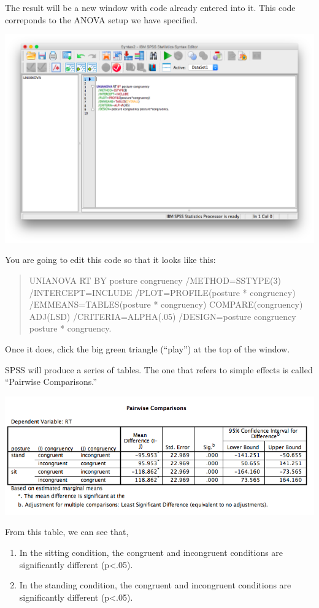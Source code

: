 \documentclass[
]{book}
\providecommand{\tightlist}{%
  \setlength{\itemsep}{0pt}\setlength{\parskip}{0pt}}
\begin{document}
The result will be a new window with code already entered into it. This code correponds to the ANOVA setup we have specified.

\includegraphics{img/10.4.20.png}

You are going to edit this code so that it looks like this:

\begin{quote}
UNIANOVA RT BY posture congruency
/METHOD=SSTYPE(3)
/INTERCEPT=INCLUDE
/PLOT=PROFILE(posture * congruency)
/EMMEANS=TABLES(posture * congruency) COMPARE(congruency) ADJ(LSD)
/CRITERIA=ALPHA(.05)
/DESIGN=posture congruency posture * congruency.
\end{quote}

Once it does, click the big green triangle (``{play}'') at the top of the window.

SPSS will produce a series of tables. The one that refers to simple effects is called ``Pairwise Comparisons.''

\includegraphics{img/10.4.22.png}

From this table, we can see that,

\begin{enumerate}
\def\labelenumi{\arabic{enumi}.}
\tightlist
\item
  In the sitting condition, the congruent and incongruent conditions are significantly different (p\textless.05).
\item
  In the standing condition, the congruent and incongruent conditions are significantly different (p\textless.05).
\end{enumerate}
\end{document}

